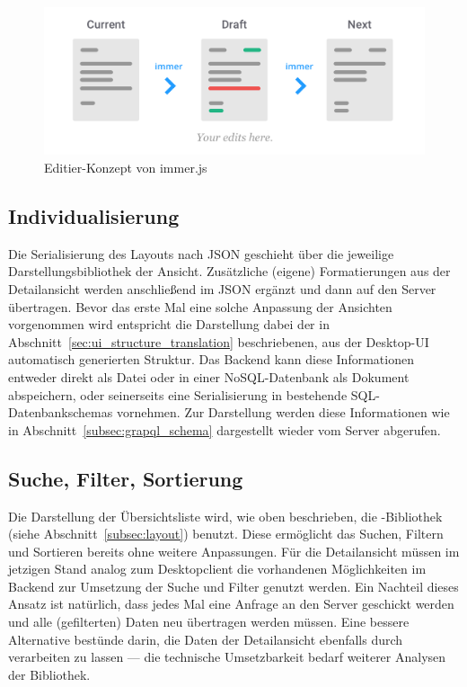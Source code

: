 \begin{figure}
    \centering
    \captionsetup{justification=centering}
    \includegraphics[width=\textwidth]{figures/immer_draft_concept.png}
        \caption{Editier-Konzept von immer.js \parencite{weststrate_2019}}\label{fig:immer_draft_concept}
\end{figure}

\subsection{Individualisierung}
Die Serialisierung des Layouts nach JSON geschieht über die jeweilige Darstellungsbibliothek der Ansicht. Zusätzliche (eigene) Formatierungen aus der Detailansicht werden anschließend im JSON ergänzt und dann auf den Server übertragen. Bevor das erste Mal eine solche Anpassung der Ansichten vorgenommen wird entspricht die Darstellung dabei der in Abschnitt~\ref{sec:ui_structure_translation} beschriebenen, aus der Desktop-UI automatisch generierten Struktur. Das Backend kann diese Informationen entweder direkt als Datei oder in einer NoSQL-Datenbank als Dokument abspeichern, oder seinerseits eine Serialisierung in bestehende SQL-Datenbankschemas vornehmen. Zur Darstellung werden diese Informationen wie in Abschnitt~\ref{subsec:grapql_schema} dargestellt wieder vom Server abgerufen.

\subsection{Suche, Filter, Sortierung}
Die Darstellung der Übersichtsliste wird, wie oben beschrieben, die -Bibliothek  (siehe Abschnitt~\ref{subsec:layout}) benutzt. Diese ermöglicht das Suchen, Filtern und Sortieren bereits ohne weitere Anpassungen. Für die Detailansicht müssen im jetzigen Stand analog zum Desktopclient die vorhandenen Möglichkeiten im Backend zur Umsetzung der Suche und Filter genutzt werden. Ein Nachteil dieses Ansatz ist natürlich, dass jedes Mal eine Anfrage an den Server geschickt werden und alle (gefilterten) Daten neu übertragen werden müssen. Eine bessere Alternative bestünde darin, die Daten der Detailansicht ebenfalls durch  verarbeiten zu lassen --- die technische Umsetzbarkeit bedarf weiterer Analysen der Bibliothek.

